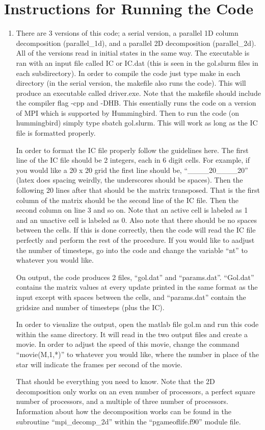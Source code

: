 \documentclass{article}
\begin{document}
\section*{Instructions for Running the Code}

\begin{enumerate}[label=\alph*)]
\item There are 3 versions of this code; a serial version, a parallel 1D column
decomposition (parallel\_1d), and a parallel 2D decomposition (parallel\_2d). All of the versions read in
initial states in the same way. The executable is ran with an input file called
IC or IC.dat (this is seen in the gol.slurm files in each subdirectory). In
order to compile the code just type make in each directory (in the serial
version, the makefile also runs the code). This will produce an executable
called driver.exe. Note that the makefile should include the compiler flag -cpp
and -DHB. This essentially runs the code on a version of MPI which is supported
by Hummingbird. Then to run the code (on hummingbird) simply type sbatch
gol.slurm. This will work as long as the IC file is formatted properly. 

In order to format the IC file properly follow the guidelines here. The first
line of the IC file should be 2 integers, each in 6 digit cells. For example, if
you would like a 20 x 20 grid the first line should be, ``\_\_\_\_20\_\_\_\_20'' (latex
does spacing weirdly, the underscores should be spaces). Then the following 20
lines after that should be the matrix transposed. That is the first column of
the matrix should be the second line of the IC file. Then the second column on
line 3 and so on. Note that an active cell is labeled as 1 and an unactive cell
is labeled as 0. Also note that there should be no spaces between the cells. If
this is done correctly, then the code will read the IC file perfectly and
perform the rest of the procedure. If you would like to aadjust the number of
timesteps, go into the code and change the variable ``nt'' to whatever you would
like. 

On output, the code produces 2 files, ``gol.dat'' and ``params.dat''.
``Gol.dat'' contains the matrix values at every update printed in the same
format as the input except with spaces between the cells, and ``params.dat''
contain the gridsize and number of timesteps (plus the IC). 

In order to visualize the output, open the matlab file gol.m and run this code
within the same directory. It will read in the two output files and create a
movie. In order to adjust the speed of this movie, change the command
``movie(M,1,*)'' to whatever you would like, where the number in place of the
star will indicate the frames per second of the movie. 

That should be everything you need to know. Note that the 2D decomposition only
works on an even number of processors, a perfect square number of processors,
and a multiple of three number of processors. Information about how the
decomposition works can be found in the subroutine ``mpi\_decomp\_2d'' within the
``pgameoflife.f90'' module file. 

\end{enumerate}
\end{document}

